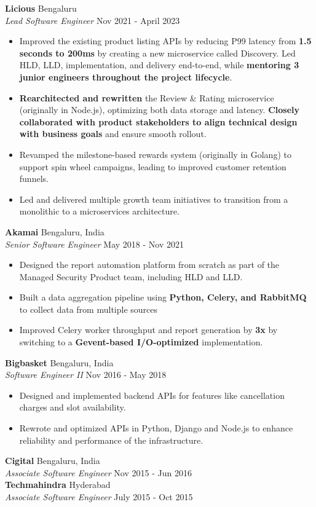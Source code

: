 \documentclass[10pt,a4paper]{article}
\begin{document}
\textbf{Licious} \hfill Bengaluru\\
\textit{Lead Software Engineer} \hfill Nov 2021 - April 2023\\
\vspace{-1mm}
\begin{itemize} \itemsep 1pt
	\item Improved the existing product listing APIs by reducing P99 latency from \textbf{1.5 seconds to 200ms} by creating a new microservice called Discovery. Led HLD, LLD, implementation, and delivery end-to-end, while \textbf{mentoring 3 junior engineers throughout the project lifecycle}.
	\item \textbf{Rearchitected and rewritten} the Review \& Rating microservice (originally in Node.js), optimizing both data storage and latency. \textbf{Closely collaborated with product stakeholders to align technical design with business goals} and ensure smooth rollout.
	\item Revamped the milestone-based rewards system (originally in Golang) to support spin wheel campaigns, leading to improved customer retention funnels.
	\item Led and delivered multiple growth team initiatives to transition from a monolithic to a microservices architecture.
\end{itemize}
\textbf{Akamai} \hfill Bengaluru, India\\
\textit{Senior Software Engineer} \hfill May 2018 - Nov 2021\\
\vspace{-1mm}
\begin{itemize} \itemsep 1pt
	\item Designed the report automation platform from scratch as part of the Managed Security Product team, including HLD and LLD.
	\item Built a data aggregation pipeline using \textbf{Python, Celery, and RabbitMQ} to collect data from multiple sources
	\item Improved Celery worker throughput and report generation by \textbf{3x} by switching to a \textbf{Gevent-based I/O-optimized} implementation.
\end{itemize}
\textbf{Bigbasket} \hfill Bengaluru, India\\
\textit{Software Engineer II} \hfill Nov 2016 - May 2018\\
\vspace{-1mm}
\begin{itemize} \itemsep 1pt
	\item Designed and implemented backend APIs for features like cancellation charges and slot availability.
	\item Rewrote and optimized APIs in Python, Django and Node.js to enhance reliability and performance of the infrastructure.
\end{itemize}
\textbf{Cigital} \hfill Bengaluru, India\\
\textit{Associate Software Engineer} \hfill Nov 2015 - Jun 2016\\
\textbf{Techmahindra} \hfill Hyderabad\\
\textit{Associate Software Engineer} \hfill July 2015 - Oct 2015\\
\end{document}
